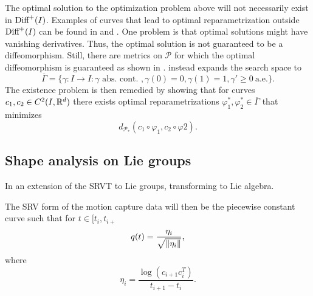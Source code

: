 The optimal solution to the optimization problem above will not necessarily exist in \(\text{Diff}^+(I)\). Examples of curves that lead to optimal reparametrization outside \(\text{Diff}^+(I)\) can be found in \cite[p.11]{bauer2015why} and \cite[Section 3.2]{woien2019}. One problem is that optimal solutions might have vanishing derivatives. Thus, the optimal solution is not guaranteed to be a diffeomorphism. Still, there are metrics on \(\mathcal{P}\) for which the optimal diffeomorphism is guaranteed as shown in \cite{bauer2014overview}. \citeauthor{bruveris1016_srvtexample} \cite{bruveris1016_srvtexample} instead expands the search space to
\begin{equation*}
  \overline \Gamma = \{\gamma : I \rightarrow I : \gamma \text{\ abs. \ cont. }, \gamma(0) = 0, \gamma(1) = 1, \gamma' \geq 0 \ \text{a.e.}\}.
\end{equation*}
The existence problem is then remedied by showing that for curves \(c_1, c_2 \in C^2(I,\mathbb{R}^d)\) there exists optimal reparametrizations \(\varphi_1^*, \varphi_2^* \in \overline{ \Gamma}\) that minimizes
\begin{equation*}
  d_{\mathcal{P}_*}(c_1 \circ \varphi_1, c_2 \circ \varphi2).
\end{equation*}

\subsection{Shape analysis on Lie groups}\label{subsec:shape-lie}
In \cite{celledoni2016} an extension of the SRVT to Lie groups, transforming to Lie algebra.

The SRV form of the motion capture data will then be the piecewise constant curve such that for \(t \in [t_i, t_{i+}\)
\begin{equation*}
  q(t) = \frac{\eta_i}{\sqrt{\norm{\eta_i}}},
\end{equation*}
where
\begin{equation*}
  \eta_i = \frac{\log(c_{i+1}c_{i}^T)}{t_{i+1} -  t_{i}}.
\end{equation*}
